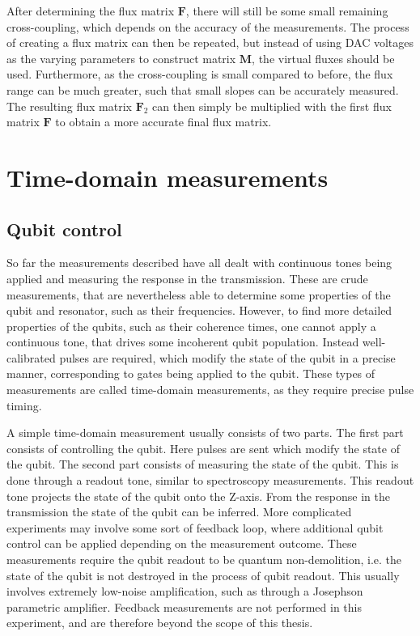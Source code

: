        After determining the flux matrix $\boldsymbol{F}$, there will still be some small remaining cross-coupling, which depends on the accuracy of the measurements. The process of creating a flux matrix can then be repeated, but instead of using DAC voltages as the varying parameters to construct matrix $\boldsymbol{M}$, the virtual fluxes should be used. Furthermore, as the cross-coupling is small compared to before, the flux range can be much greater, such that small slopes can be accurately measured. The resulting flux matrix $\boldsymbol{F}_2$ can then simply be multiplied with the first flux matrix $\boldsymbol{F}$ to obtain a more accurate final flux matrix.

    \section{Time-domain measurements}
      \subsection{Qubit control}
        So far the measurements described have all dealt with continuous tones being applied and measuring the response in the transmission. These are crude measurements, that are nevertheless able to determine some properties of the qubit and resonator, such as their frequencies. However, to find more detailed properties of the qubits, such as their coherence times, one cannot apply a continuous tone, that drives some incoherent qubit population. Instead well-calibrated pulses are required, which modify the state of the qubit in a precise manner, corresponding to gates being applied to the qubit. These types of measurements are called time-domain measurements, as they require precise pulse timing.

        A simple time-domain measurement usually consists of two parts. The first part consists of controlling the qubit. Here pulses are sent which modify the state of the qubit. The second part consists of measuring the state of the qubit. This is done through a readout tone, similar to spectroscopy measurements. This readout tone projects the state of the qubit onto the Z-axis. From the response in the transmission the state of the qubit can be inferred. More complicated experiments may involve some sort of feedback loop, where additional qubit control can be applied depending on the measurement outcome. These measurements require the qubit readout to be quantum non-demolition, i.e. the state of the qubit is not destroyed in the process of qubit readout. This usually involves extremely low-noise amplification, such as through a Josephson parametric amplifier. Feedback measurements are not performed in this experiment, and are therefore beyond the scope of this thesis.

